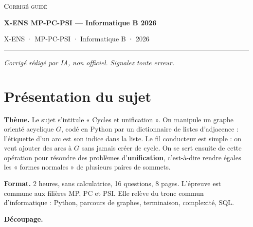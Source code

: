 \documentclass[11pt,a4paper]{article}
\begin{document}
\thispagestyle{plain}
\begin{center}
  {\small\scshape Corrigé guidé}\par\smallskip
  {\LARGE\bfseries X-ENS MP-PC-PSI — Informatique B 2026\par}\medskip
  {\large X-ENS · MP-PC-PSI · Informatique B · 2026\par}
\end{center}
\vspace{2pt}\hrule\vspace{8pt}

\emph{Corrigé rédigé par IA, non officiel. Signalez toute erreur.}

\hypertarget{pruxe9sentation-du-sujet}{%
\section{Présentation du sujet}\label{pruxe9sentation-du-sujet}}

\textbf{Thème.} Le sujet s'intitule « Cycles et unification ». On manipule un graphe orienté acyclique \(G\), codé en Python par un dictionnaire de listes d'adjacence : l'étiquette d'un arc est son indice dans la liste. Le fil conducteur est simple : on veut ajouter des arcs à \(G\) sans jamais créer de cycle. On se sert ensuite de cette opération pour résoudre des problèmes d'\textbf{unification}, c'est-à-dire rendre égales les « formes normales » de plusieurs paires de sommets.

\textbf{Format.} 2 heures, sans calculatrice, 16 questions, 8 pages. L'épreuve est commune aux filières MP, PC et PSI. Elle relève du tronc commun d'informatique : Python, parcours de graphes, terminaison, complexité, SQL.

\textbf{Découpage.}
\end{document}
